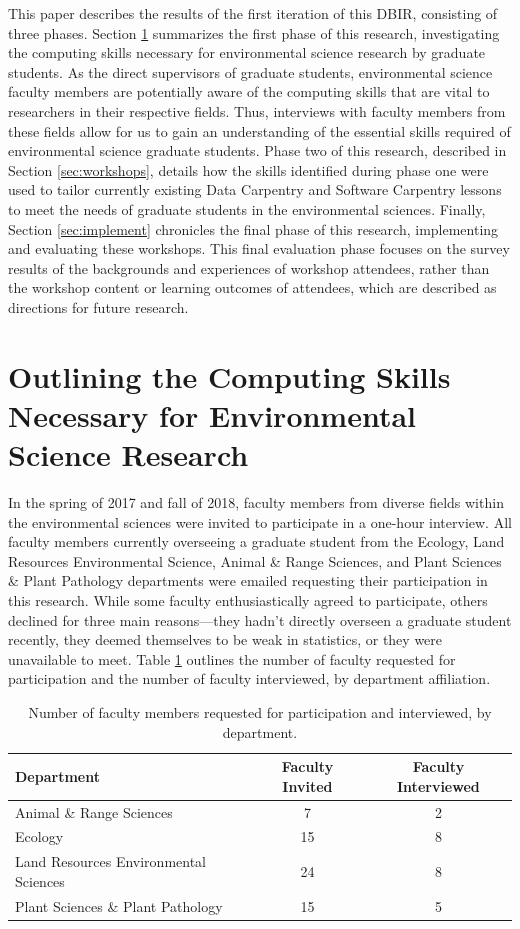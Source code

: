 \documentclass[12pt]{article}
\begin{document}
\quad This paper describes the results of the first iteration of this DBIR, 
consisting of three phases. Section \ref{sec:faculty} summarizes the first phase
of this research, investigating the computing skills necessary for environmental
science research by graduate students. As the direct supervisors of graduate
students, environmental science faculty members are potentially aware of the
computing skills that are vital to researchers in their respective fields. Thus,
interviews with faculty members from these fields allow for us to gain an
understanding of the essential skills required of environmental science graduate
students. Phase two of this research, described in Section \ref{sec:workshops}, 
details how the skills identified during phase one were used to tailor
currently existing Data Carpentry \citeyear{data-carpentry} and Software
Carpentry \citeyear{software-carpentry} lessons to meet the needs of graduate
students in the environmental sciences. Finally, Section \ref{sec:implement}
chronicles the final phase of this research, implementing and evaluating these
workshops. This final evaluation phase focuses on the survey results of the 
backgrounds and experiences of workshop attendees, rather than the workshop
content or learning outcomes of attendees, which are described as directions for
future research. 


\section{Outlining the Computing Skills Necessary for Environmental Science Research}
\label{sec:faculty}

\quad In the spring of 2017 and fall of 2018, faculty members from diverse 
fields within the environmental sciences were invited to participate in a 
one-hour interview. All faculty members currently overseeing a graduate student
from the Ecology, Land Resources Environmental Science, Animal \& Range 
Sciences, and Plant Sciences \& Plant Pathology departments were emailed 
requesting their participation in this research. While some faculty 
enthusiastically agreed to participate, others declined for three main 
reasons---they hadn't directly overseen a graduate student recently, they deemed
themselves to be weak in statistics, or they were unavailable to meet. Table 
\ref{tab:faculty} outlines the number of faculty requested for participation and
the number of faculty interviewed, by department affiliation. 

{
\begin{table}[h!]
\centering
\begin{tabular}{lcc}
\hline
Department & Faculty Invited & Faculty Interviewed  \\
\hline
Animal \& Range Sciences & 7 & 2 \\
Ecology & 15 & 8 \\
Land Resources Environmental Sciences & 24 & 8 \\
Plant Sciences \& Plant Pathology &  15 & 5 \\ 
\hline
\end{tabular}
\caption{Number of faculty members requested for participation and interviewed,
by department.}
\label{tab:faculty}
\end{table}
}
\end{document}
